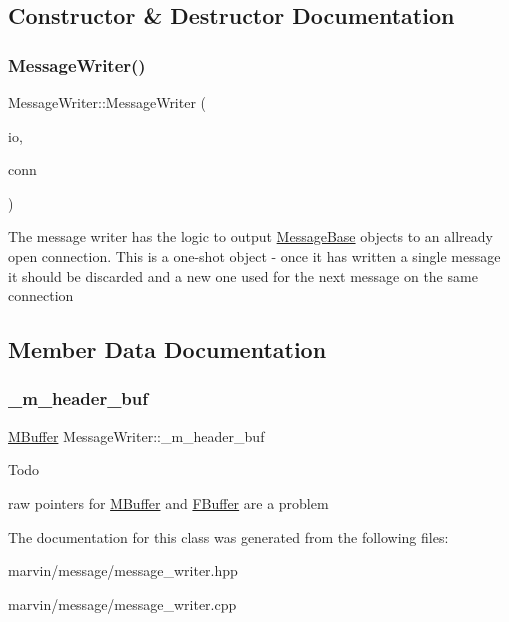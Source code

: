 \subsection{Constructor \& Destructor Documentation}
\mbox{\label{class_message_writer_a92f4d619f9ef47dee6237d2826ab6b18}} 
\subsubsection{\texorpdfstring{Message\+Writer()}{MessageWriter()}}
{\footnotesize\ttfamily Message\+Writer\+::\+Message\+Writer (\begin{DoxyParamCaption}\item[{boost\+::asio\+::io\+\_\+service \&}]{io,  }\item[{Connection\+Interface\+S\+Ptr}]{conn }\end{DoxyParamCaption})}

The message writer has the logic to output \hyperlink{class_message_base}{Message\+Base} objects to an allready open connection. This is a one-\/shot object -\/ once it has written a single message it should be discarded and a new one used for the next message on the same connection 

\subsection{Member Data Documentation}
\mbox{\label{class_message_writer_a77fcbd1fa4556cb745536c5a1eee6d70}} 
\subsubsection{\texorpdfstring{\+\_\+m\+\_\+header\+\_\+buf}{\_m\_header\_buf}}
{\footnotesize\ttfamily \hyperlink{struct_m_buffer}{M\+Buffer} Message\+Writer\+::\+\_\+m\+\_\+header\+\_\+buf\hspace{0.3cm}{\ttfamily [protected]}}

\begin{DoxyRefDesc}{Todo}
\item[\hyperlink{todo__todo000001}{Todo}]
\begin{DoxyItemize}
\item raw pointers for \hyperlink{struct_m_buffer}{M\+Buffer} and \hyperlink{class_f_buffer}{F\+Buffer} are a problem 
\end{DoxyItemize}\end{DoxyRefDesc}


The documentation for this class was generated from the following files\+:\begin{DoxyCompactItemize}
\item 
marvin/message/message\+\_\+writer.\+hpp\item 
marvin/message/message\+\_\+writer.\+cpp\end{DoxyCompactItemize}
